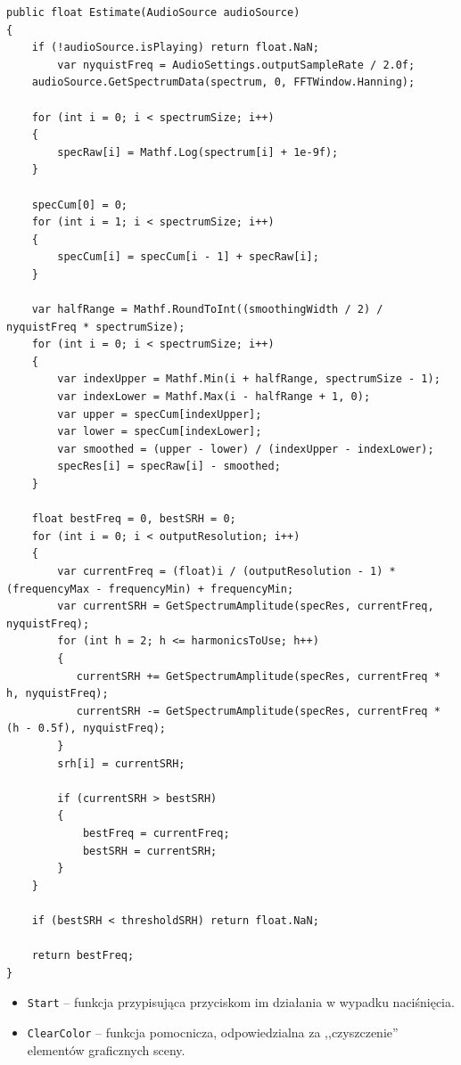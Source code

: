 \begin{lstlisting}[style=sharpcstyle,caption=Funkcja \texttt{Estimate}, label=lst:1]
public float Estimate(AudioSource audioSource)
{
    if (!audioSource.isPlaying) return float.NaN;
		var nyquistFreq = AudioSettings.outputSampleRate / 2.0f;
    audioSource.GetSpectrumData(spectrum, 0, FFTWindow.Hanning);

    for (int i = 0; i < spectrumSize; i++)
    {       
        specRaw[i] = Mathf.Log(spectrum[i] + 1e-9f);
    }

    specCum[0] = 0;
    for (int i = 1; i < spectrumSize; i++)
    {
        specCum[i] = specCum[i - 1] + specRaw[i];
    }

    var halfRange = Mathf.RoundToInt((smoothingWidth / 2) / nyquistFreq * spectrumSize);
    for (int i = 0; i < spectrumSize; i++)
    {    
        var indexUpper = Mathf.Min(i + halfRange, spectrumSize - 1);
        var indexLower = Mathf.Max(i - halfRange + 1, 0);
        var upper = specCum[indexUpper];
        var lower = specCum[indexLower];
        var smoothed = (upper - lower) / (indexUpper - indexLower);        
        specRes[i] = specRaw[i] - smoothed;
    }

    float bestFreq = 0, bestSRH = 0;
    for (int i = 0; i < outputResolution; i++)
    {
        var currentFreq = (float)i / (outputResolution - 1) * (frequencyMax - frequencyMin) + frequencyMin;       
        var currentSRH = GetSpectrumAmplitude(specRes, currentFreq, nyquistFreq);
        for (int h = 2; h <= harmonicsToUse; h++)
        {
           currentSRH += GetSpectrumAmplitude(specRes, currentFreq * h, nyquistFreq);
           currentSRH -= GetSpectrumAmplitude(specRes, currentFreq * (h - 0.5f), nyquistFreq);
        }
        srh[i] = currentSRH;
       
        if (currentSRH > bestSRH)
        {
            bestFreq = currentFreq;
            bestSRH = currentSRH;
        }
    }
    
    if (bestSRH < thresholdSRH) return float.NaN;

    return bestFreq;
}
\end{lstlisting}

\begin{itemize}
    \item \texttt{Start} -- funkcja przypisująca przyciskom im działania w wypadku naciśnięcia.
    \item \texttt{ClearColor} -- funkcja pomocnicza, odpowiedzialna za ,,czyszczenie'' elementów graficznych sceny.
\end{itemize}

